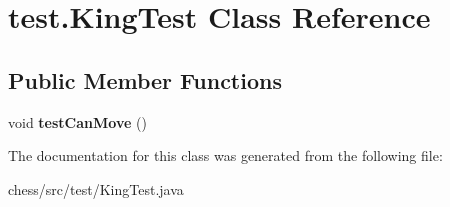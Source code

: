 \hypertarget{classtest_1_1_king_test}{}\section{test.\+King\+Test Class Reference}
\label{classtest_1_1_king_test}
\subsection*{Public Member Functions}
\begin{DoxyCompactItemize}
\item 
\mbox{\label{classtest_1_1_king_test_a612e92d08318b1b8a4b45be7c3048234}} 
void {\bfseries test\+Can\+Move} ()
\end{DoxyCompactItemize}


The documentation for this class was generated from the following file\+:\begin{DoxyCompactItemize}
\item 
chess/src/test/King\+Test.\+java\end{DoxyCompactItemize}
